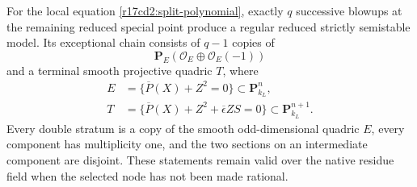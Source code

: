 \begin{proposition}
\label{r17cd2:chains}
For the local equation \eqref{r17cd2:split-polynomial},
exactly $q$ successive blowups at the remaining reduced
special point produce a regular reduced strictly semistable
model. Its exceptional chain consists of $q-1$ copies of
\[
       \mathbf P_E(\mathcal O_E\oplus\mathcal O_E(-1))
\]
and a terminal smooth projective quadric $T$, where
\[
 \begin{split}
 E&=\{\overline P(X)+Z^2=0\}\subset\mathbf P^n_{k_L},\\
 T&=\{\overline P(X)+Z^2+\overline\epsilon ZS=0\}
                                      \subset\mathbf P^{n+1}_{k_L}.
 \end{split}
 \tag{CD217.3}\label{r17cd2:quadrics}
\]
Every double stratum is a copy of the smooth odd-dimensional
quadric $E$, every component has multiplicity one, and the
two sections on an intermediate component are disjoint.
These statements remain valid over the native residue field
when the selected node has not been made rational.
\end{proposition}

